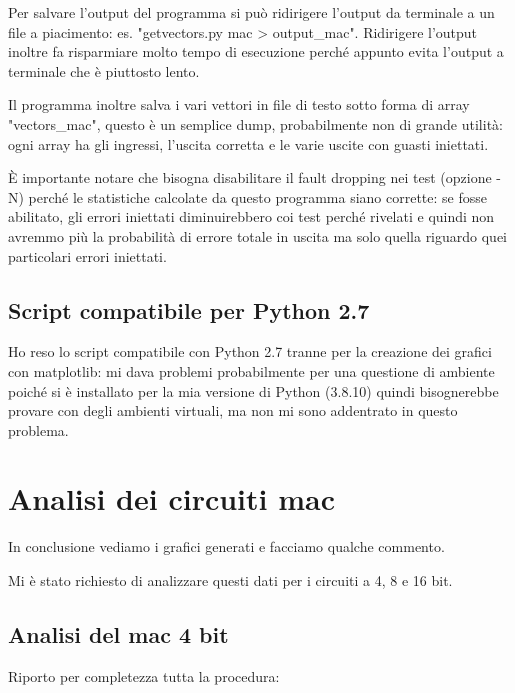 \documentclass[12pt, letterpaper]{article}
\begin{document}
Per salvare l'output del programma si può ridirigere l'output da terminale a un file a piacimento: es. "getvectors.py mac > output\_mac".
Ridirigere l'output inoltre fa risparmiare molto tempo di esecuzione perché appunto evita l'output a terminale che è piuttosto lento. 

Il programma inoltre salva i vari vettori in file di testo sotto forma di array "vectors\_mac", questo è un semplice dump, probabilmente non di grande utilità: ogni array ha gli ingressi, l'uscita corretta e le varie uscite con guasti iniettati.

È importante notare che bisogna disabilitare il fault dropping nei test (opzione -N) perché le statistiche calcolate da questo programma siano corrette: se fosse abilitato, gli errori iniettati diminuirebbero coi test perché rivelati e quindi non avremmo più la probabilità di errore totale in uscita ma solo quella riguardo quei particolari errori iniettati.

\subsection{Script compatibile per Python 2.7}

Ho reso lo script compatibile con Python 2.7 tranne per la creazione dei grafici con matplotlib: mi dava problemi probabilmente per una questione di ambiente poiché si è installato per la mia versione di Python (3.8.10) quindi bisognerebbe provare con degli ambienti virtuali, ma non mi sono addentrato in questo problema.

\section{Analisi dei circuiti mac}

In conclusione vediamo i grafici generati e facciamo qualche commento.

Mi è stato richiesto di analizzare questi dati per i circuiti a 4, 8 e 16 bit.

\subsection{Analisi del mac 4 bit}

Riporto per completezza tutta la procedura:
\end{document}
